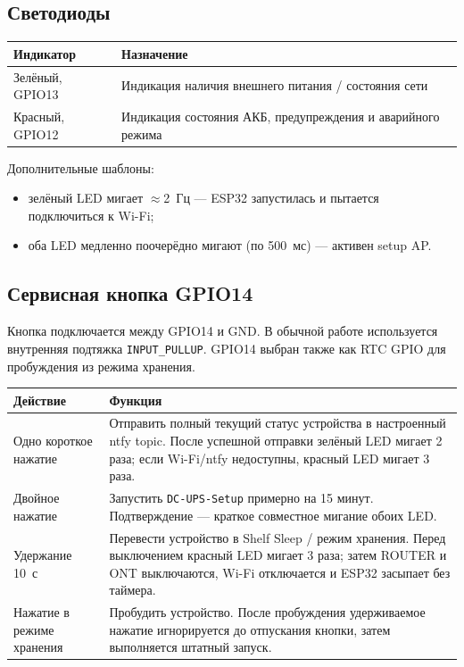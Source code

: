 \documentclass[11pt,a4paper]{article}
\begin{document}
\subsection{Светодиоды}
\begin{tabularx}{\textwidth}{@{}lX@{}}
\toprule
\textbf{Индикатор} & \textbf{Назначение} \\
\midrule
Зелёный, GPIO13 & Индикация наличия внешнего питания / состояния сети \\
Красный, GPIO12 & Индикация состояния АКБ, предупреждения и аварийного режима \\
\bottomrule
\end{tabularx}

Дополнительные шаблоны:
\begin{itemize}
  \item зелёный LED мигает $\approx$2~Гц --- ESP32 запустилась и пытается подключиться к Wi-Fi;
  \item оба LED медленно поочерёдно мигают (по 500~мс) --- активен setup AP.
\end{itemize}

\subsection{Сервисная кнопка GPIO14}
Кнопка подключается между GPIO14 и GND. В обычной работе используется внутренняя подтяжка \texttt{INPUT\_PULLUP}. GPIO14 выбран также как RTC GPIO для пробуждения из режима хранения.

\begin{tabularx}{\textwidth}{@{}p{38mm}X@{}}
\toprule
\textbf{Действие} & \textbf{Функция} \\
\midrule
Одно короткое нажатие & Отправить полный текущий статус устройства в настроенный ntfy topic. После успешной отправки зелёный LED мигает 2 раза; если Wi-Fi/ntfy недоступны, красный LED мигает 3 раза. \\
Двойное нажатие & Запустить \texttt{DC-UPS-Setup} примерно на 15 минут. Подтверждение --- краткое совместное мигание обоих LED. \\
Удержание 10~с & Перевести устройство в Shelf Sleep / режим хранения. Перед выключением красный LED мигает 3 раза; затем ROUTER и ONT выключаются, Wi-Fi отключается и ESP32 засыпает без таймера. \\
Нажатие в режиме хранения & Пробудить устройство. После пробуждения удерживаемое нажатие игнорируется до отпускания кнопки, затем выполняется штатный запуск. \\
\bottomrule
\end{tabularx}
\end{document}
